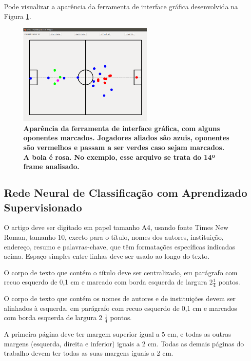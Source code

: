 \documentclass[10pt,fleqn,a4paper]{article}
\begin{document}
Pode visualizar a aparência da ferramenta de interface gráfica desenvolvida na Figura \ref{fig:exemplo-interface}.

\begin{figure}
\centering
\includegraphics[width=0.6\textwidth]{figures/exemplo-interface.png}
\caption{\textbf{Aparência da ferramenta de interface gráfica, com alguns oponentes marcados. Jogadores aliados são azuis, oponentes são vermelhos e passam a ser verdes caso sejam marcados. A bola é rosa. No exemplo, esse arquivo se trata do 14º frame analisado.}} \label{fig:exemplo-interface}
\end{figure}
    
    \subsection{Rede Neural de Classificação com Aprendizado Supervisionado}
        
        O artigo deve ser digitado em papel tamanho A4, usando fonte Times New Roman, tamanho 10, exceto para o título, nomes dos autores, instituição, endereço, resumo e palavras-chave, que têm formatações específicas indicadas acima. Espaço simples entre linhas deve ser usado ao longo do texto.

        O corpo de texto que contém o título deve ser centralizado, em parágrafo com recuo esquerdo de 0,1 cm e marcado com borda esquerda de largura 2$\frac{1}{4}$ pontos.

        O corpo de texto que contém os nomes de autores e de instituições devem ser alinhados à esquerda, em parágrafo com recuo esquerdo de 0,1 cm e marcados com borda esquerda de largura 2 $\frac{1}{4}$ pontos.

        A primeira página deve ter margem superior igual a 5 cm, e todas as outras margens (esquerda, direita e inferior) iguais a 2 cm. Todas as demais páginas do trabalho devem ter todas as suas margens iguais a 2 cm.
\end{document}
